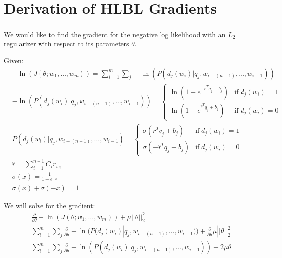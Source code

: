 
\chapter{Derivation of HLBL Gradients}
\paragraph{}
We would like to find the gradient for the negative log likelihood with an $L_2$ regularizer with respect to its parameters $\theta$.

Given:
\begin{align*}
&-\ln(J(\theta;w_1,\dots, w_m)) = \sum_{i=1}^{m} \sum_j -\ln(P(d_j(w_i) | q_j, w_{i-(n-1)},\dots, w_{i-1}))
\\ 
&-\ln(P(d_j(w_i) | q_j, w_{i-(n-1)},\dots, w_{i-1})) =  
\begin{cases}
  \ln (1 + e^{-\hat{r}^T q_{j} -b_{j}}) & \text{if } d_j(w_i)  = 1 \\
  \ln (1 + e^{\hat{r}^T q_{j} +b_{j}})     & \text{if } d_j(w_i) = 0
  \end{cases}
\\
&P(d_j(w_i) | q_j, w_{i-(n-1)},\dots, w_{i-1}) =  
\begin{cases}
  \sigma(\hat{r}^T q_{j} +b_{j}) & \text{if } d_j(w_i)  = 1 \\
  \sigma(-\hat{r}^T q_{j} -b_{j})     & \text{if } d_j(w_i) = 0
  \end{cases}
\\
&\hat{r} = \sum_{i=1}^{n-1} C_i r_{w_i} 
\\
&\sigma(x) = \frac{1}{1+e^{-x}}
\\
&\sigma(x) +\sigma(-x) = 1
\end{align*}

We will solve for the gradient:
\begin{align*}
&\frac{\partial}{\partial \theta} -\ln(J(\theta;w_1,\dots, w_m)) +  \mu ||\theta||^2_2
\\
& \sum_{i=1}^{m} \sum_j \frac{\partial}{\partial \theta} -\ln(P(d_j(w_i) | q_j, w_{i-(n-1)},\dots, w_{i-1})) +\frac{\partial}{\partial \theta}  \mu ||\theta||^2_2
\\
& \sum_{i=1}^{m} \sum_j \frac{\partial}{\partial \theta} -\ln(P(d_j(w_i) | q_j, w_{i-(n-1)},\dots, w_{i-1})) + 2 \mu \theta
\end{align*}

